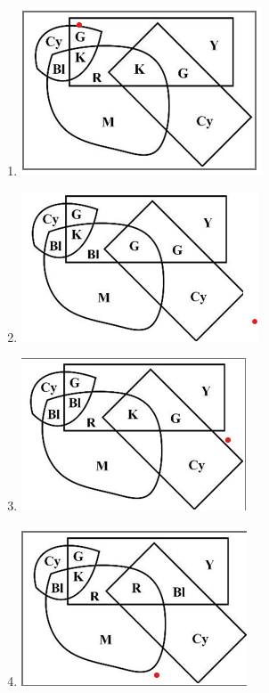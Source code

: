\documentclass[journal,12pt,onecolumn]{IEEEtran}
\theoremstyle{remark}
\begin{document}
\begin{enumerate}
\begin{enumerate}
    \item \includegraphics[width=0.6\columnwidth]{figs/option1.png}
    \item \includegraphics[width=0.6\columnwidth]{figs/option2.png}
    \item \includegraphics[width=0.6\columnwidth]{figs/option3.png}
    \item \includegraphics[width=0.6\columnwidth]{figs/option4.png}
\end{enumerate}


\end{enumerate}
\end{document}
